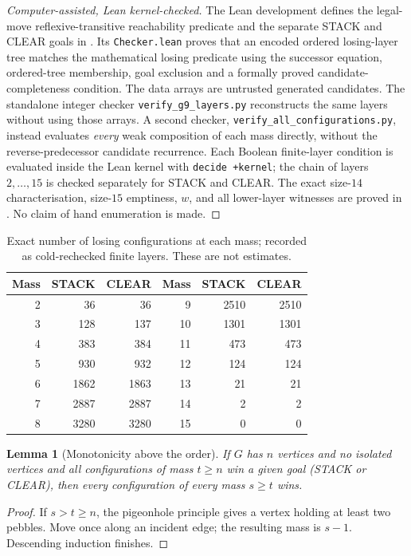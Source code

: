 \documentclass[10pt,a4paper]{article}
\newtheorem{lemma}{Lemma}[section]
\begin{document}
\begin{proof}[Computer-assisted, Lean kernel-checked]
The Lean development defines the legal-move reflexive-transitive reachability predicate and the separate STACK and CLEAR goals in . Its \texttt{Checker.lean} proves that an encoded ordered losing-layer tree matches the mathematical losing predicate using the successor equation, ordered-tree membership, goal exclusion and a formally proved candidate-completeness condition. The data arrays are untrusted generated candidates.
The standalone integer checker \texttt{verify\_g9\_layers.py}
reconstructs the same layers without using those arrays. A second
checker, \texttt{verify\_all\_configurations.py}, instead evaluates
\emph{every} weak composition of each mass directly, without the
reverse-predecessor candidate recurrence. Each Boolean finite-layer condition is evaluated inside the Lean kernel with \texttt{decide +kernel}; the chain of layers \(2,\ldots,15\) is checked separately for STACK and CLEAR. The exact size-\(14\) characterisation, size-\(15\) emptiness, \(w\), and all lower-layer witnesses are proved in . No claim of hand enumeration is made.
\end{proof}
\begin{table}[H]\centering\small
\begin{tabular}{r rr@{\quad}r rr}\toprule
Mass & STACK & CLEAR & Mass & STACK & CLEAR\\\midrule
2&36&36&9&2510&2510\\
3&128&137&10&1301&1301\\
4&383&384&11&473&473\\
5&930&932&12&124&124\\
6&1862&1863&13&21&21\\
7&2887&2887&14&2&2\\
8&3280&3280&15&0&0\\\bottomrule
\end{tabular}
\caption{Exact number of losing configurations at each mass; recorded as cold-rechecked finite layers. These are not estimates.}\label{tab:counts}
\end{table}
\begin{lemma}[Monotonicity above the order]\label{lem:monotonic}
If \(G\) has \(n\) vertices and no isolated vertices and all configurations of mass \(t\ge n\) win a given goal (STACK or CLEAR), then every configuration of every mass \(s\ge t\) wins.
\end{lemma}
\begin{proof}
If \(s>t\ge n\), the pigeonhole principle gives a vertex holding at least two pebbles. Move once along an incident edge; the resulting mass is \(s-1\). Descending induction finishes.
\end{proof}
\end{document}
